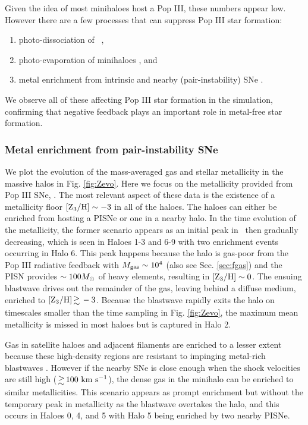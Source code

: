 \documentclass[useAMS,usenatbib]{mn2e}
\begin{document}
Given the idea of most minihaloes host a Pop III, these numbers appear
low.  However there are a few processes that can suppress Pop III star
formation:
%
\begin{enumerate}
\item photo-dissociation of \hh~\citep{Dekel87, Haiman00, Machacek01},
\item photo-evaporation of minihaloes \citep{Shapiro04, whalen08}, and
\item metal enrichment from intrinsic and nearby (pair-instability)
  SNe \citep{Wise08_Gal, Trenti09, Greif10}.
\end{enumerate}
We observe all of these affecting Pop III star formation in the
simulation, confirming that negative feedback plays an important role
in metal-free star formation.

\subsubsection{Metal enrichment from pair-instability SNe}

We plot the evolution of the mass-averaged gas and stellar metallicity
in the massive halos in Fig. \ref{fig:Zevo}.  Here we focus on the
metallicity provided from Pop III SNe, \zthree.  The most relevant
aspect of these data is the existence of a metallicity floor $\zthree
\sim -3$ in all of the haloes.  The haloes can either be enriched from
hosting a PISNe or one in a nearby halo.  In the time evolution of the
metallicity, the former scenario appears as an initial peak in
\zthree~then gradually decreasing, which is seen in Haloes 1-3 and 6-9
with two enrichment events occurring in Halo 6.  This peak happens
because the halo is gas-poor from the Pop III radiative feedback with
$M_{\rm gas} \sim 10^4$ (also see Sec. \ref{sec:fgas}) and the PISN
provides $\sim 100 \Ms$ of heavy elements, resulting in $\zthree \sim
0$.  The ensuing blastwave drives out the remainder of the gas,
leaving behind a diffuse medium, enriched to $\zthree \ga -3$.
Because the blastwave rapidly exits the halo on timescales smaller
than the time sampling in Fig. \ref{fig:Zevo}, the maximum mean
metallicity is missed in most haloes but is captured in Halo 2.

Gas in satellite haloes and adjacent filaments are enriched to a
lesser extent because these high-density regions are resistant to
impinging metal-rich blastwaves \citep[cf.][]{Cen08}.  However if the
nearby SNe is close enough when the shock velocities are still high
($\ga 100~\kms$), the dense gas in the minihalo can be enriched to
similar metallicities.  This scenario appears as prompt enrichment but
without the temporary peak in metallicity as the blastwave overtakes
the halo, and this occurs in Haloes 0, 4, and 5 with Halo 5 being
enriched by two nearby PISNe.
\end{document}
